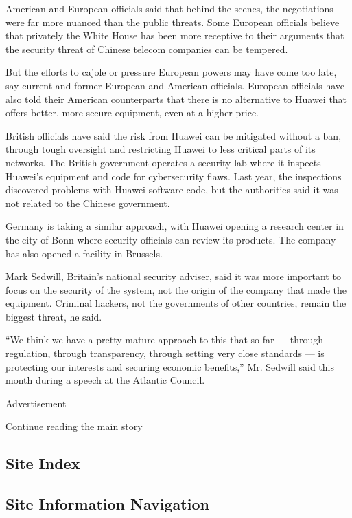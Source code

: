 American and European officials said that behind the scenes, the
negotiations were far more nuanced than the public threats. Some
European officials believe that privately the White House has been more
receptive to their arguments that the security threat of Chinese telecom
companies can be tempered.

But the efforts to cajole or pressure European powers may have come too
late, say current and former European and American officials. European
officials have also told their American counterparts that there is no
alternative to Huawei that offers better, more secure equipment, even at
a higher price.

British officials have said the risk from Huawei can be mitigated
without a ban, through tough oversight and restricting Huawei to less
critical parts of its networks. The British government operates a
security lab where it inspects Huawei's equipment and code for
cybersecurity flaws. Last year, the inspections discovered problems with
Huawei software code, but the authorities said it was not related to the
Chinese government.

Germany is taking a similar approach, with Huawei opening a research
center in the city of Bonn where security officials can review its
products. The company has also opened a facility in Brussels.

Mark Sedwill, Britain's national security adviser, said it was more
important to focus on the security of the system, not the origin of the
company that made the equipment. Criminal hackers, not the governments
of other countries, remain the biggest threat, he said.

``We think we have a pretty mature approach to this that so far ---
through regulation, through transparency, through setting very close
standards --- is protecting our interests and securing economic
benefits,'' Mr. Sedwill said this month during a speech at the Atlantic
Council.

Advertisement

\protect\hyperlink{after-bottom}{Continue reading the main story}

\hypertarget{site-index}{%
\subsection{Site Index}\label{site-index}}

\hypertarget{site-information-navigation}{%
\subsection{Site Information
Navigation}\label{site-information-navigation}}

